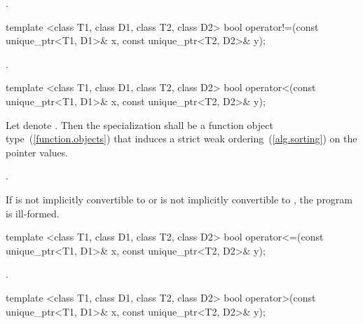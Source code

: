 \begin{itemdescr}
\pnum
\returns {}.
\end{itemdescr}

%
\begin{itemdecl}
template <class T1, class D1, class T2, class D2>
  bool operator!=(const unique_ptr<T1, D1>& x, const unique_ptr<T2, D2>& y);
\end{itemdecl}

\begin{itemdescr}
\pnum
\returns {}.
\end{itemdescr}

%
\begin{itemdecl}
template <class T1, class D1, class T2, class D2>
  bool operator<(const unique_ptr<T1, D1>& x, const unique_ptr<T2, D2>& y);
\end{itemdecl}

\begin{itemdescr}
\pnum
\requires Let  denote . Then the specialization
 shall be a function object type~(\ref{function.objects}) that
induces a strict weak ordering~(\ref{alg.sorting}) on the pointer values.

\pnum
\returns {}.

\pnum
\remarks If  is not implicitly convertible
to  or  is not implicitly
convertible to , the program is ill-formed.
\end{itemdescr}

%
\begin{itemdecl}
template <class T1, class D1, class T2, class D2>
  bool operator<=(const unique_ptr<T1, D1>& x, const unique_ptr<T2, D2>& y);
\end{itemdecl}

\begin{itemdescr}
\pnum
\returns {}.
\end{itemdescr}

%
\begin{itemdecl}
template <class T1, class D1, class T2, class D2>
  bool operator>(const unique_ptr<T1, D1>& x, const unique_ptr<T2, D2>& y);
\end{itemdecl}

